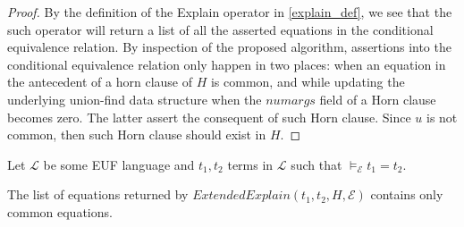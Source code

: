 \begin{proof}
  By the definition of the Explain operator in \ref{explain_def},
  we see that the such operator will return a
  list of all the asserted equations in the conditional
  equivalence relation. By inspection of the proposed
  algorithm, assertions into the conditional equivalence
  relation only happen in two places: when an equation 
  in the antecedent of a horn clause of $H$ is common, 
  and while updating the underlying union-find data structure
  when the $numargs$ field of a Horn clause becomes
  zero. The latter assert the consequent of such Horn clause.
  Since $u$ is not common, then such Horn clause 
  should exist in $H$.
\end{proof}

\begin{lemma}\label{extended_explain_common_lemma}

  Let $\mathcal{L}$ be some EUF language 
  and $t_1, t_2$ terms in 
  $\mathcal{L}$ such that
  $\models_{\mathcal{E}} t_1 = t_2$.

  The list of equations returned by $ExtendedExplain(t_1, t_2, 
  H, \mathcal{E})$ contains only common equations.
\end{lemma}

